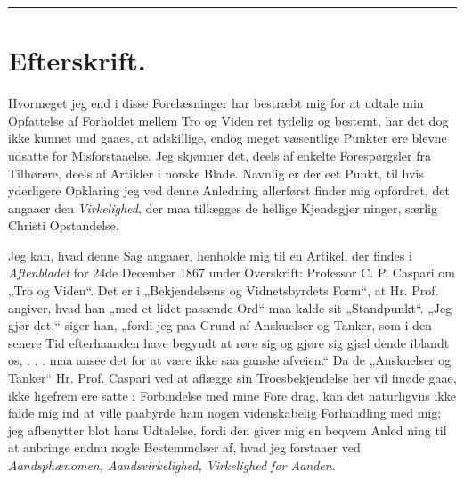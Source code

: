 \documentclass[12pt]{book}
\newcommand{\opage}[1]{\marginnote{\footnotesize\textit{[#1]}}}
\begin{document}
\begin{center}\rule{3cm}{0.4pt}\end{center}


\chapter*{Efterskrift.}
\label{ch:efterskrift}
\opage{297}\setcounter{footnote}{0}%
Hvormeget jeg end i disse Forelæsninger har bestræbt mig
for at udtale min Opfattelse af Forholdet mellem Tro og
Viden ret tydelig og bestemt, har det dog ikke kunnet und\-%
gaaes, at adskillige, endog meget væsentlige Punkter ere blevne
udsatte for Misforstaaelse. Jeg skjønner det, deels af enkelte
Forespørgsler fra Tilhørere, deels af Artikler i norske Blade.
Navnlig er der eet Punkt, til hvis yderligere Opklaring jeg
ved denne Anledning allerførst finder mig opfordret, det angaaer
den \emph{Virkelighed}, der maa tillægges de hellige Kjendsgjer\-%
ninger, særlig Christi Opstandelse.

Jeg kan, hvad denne Sag angaaer, henholde mig til en
Artikel, der findes i \emph{Aftenbladet} for 24de December 1867
under Overskrift: Professor C. P. Caspari om „Tro og Viden“.
Det er i „Bekjendelsens og Vidnetsbyrdets Form“, at Hr.
Prof. angiver, hvad han „med et lidet passende Ord“ maa
kalde sit „Standpunkt“. „Jeg gjør det,“ siger han, „fordi
jeg paa Grund af Anskuelser og Tanker, som i den senere
Tid efterhaanden have begyndt at røre sig og gjøre sig gjæl\-%
dende iblandt os, . . . maa ansee det for at være ikke saa
ganske afveien.“ Da de „Anskuelser og Tanker“ Hr. Prof.
Caspari ved at aflægge sin Troesbekjendelse her vil imøde\-%
gaae, ikke ligefrem ere satte i Forbindelse med mine Fore\-%
drag, kan det naturligviis ikke falde mig ind at ville paabyrde
\opage{298}\setcounter{footnote}{0}%
ham nogen videnskabelig Forhandling med mig; jeg afbenytter
blot hans Udtalelse, fordi den giver mig en beqvem Anled\-%
ning til at anbringe endnu nogle Bestemmelser af, hvad jeg
forstaaer ved \emph{Aandsphænomen, Aandsvirkelighed,
Virkelighed for Aanden}.
\end{document}
